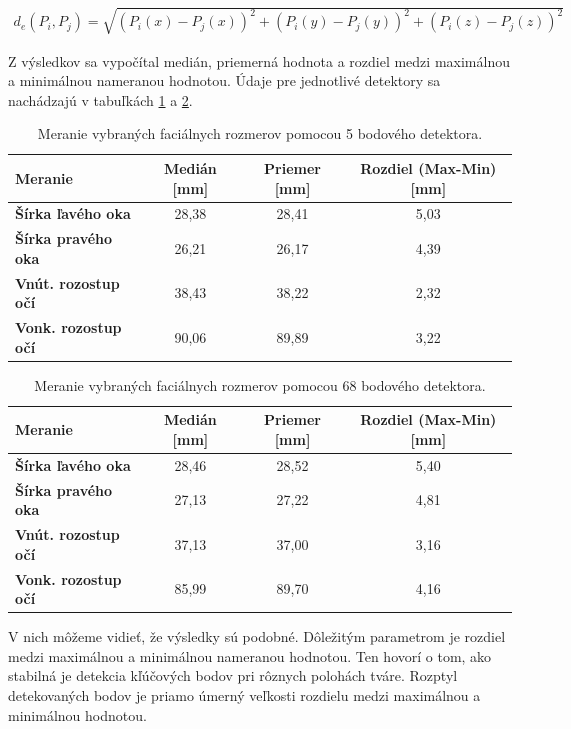 \begin{equation}
\label{eq:euclidean}
\begin{aligned}
d_{e}\left(P_i,P_j\right)= \sqrt{\left(P_i(x) - P_j(x)\right)^2 + \left(P_i(y) - P_j(y)\right)^2 + \left(P_i(z) - P_j(z)\right)^2} 
\end{aligned}
\end{equation}

Z výsledkov sa vypočítal medián, priemerná hodnota a rozdiel medzi maximálnou a minimálnou nameranou hodnotou. Údaje pre jednotlivé detektory sa nachádzajú v tabuľkách \ref{tab:dlib:5points} a \ref{tab:dlib:68points}.
 
\begin{table}[h]
	\caption{\label{tab:dlib:5points} Meranie vybraných faciálnych rozmerov pomocou 5 bodového detektora.}
	\centering
	\begin{tabular}{lccc}
		\toprule
		\textbf{Meranie} & \textbf{Medián [mm]} & \textbf{Priemer [mm]} & \textbf{Rozdiel (Max-Min) [mm]} \\ 
		\midrule
		\textbf{Šírka ľavého oka} 	& 28,38 & 28,41	& 5,03 \\
		\textbf{Šírka pravého oka} 	& 26,21	& 26,17 & 4,39 \\
		\textbf{Vnút. rozostup očí} 	& 38,43	& 38,22 & 2,32 \\
		\textbf{Vonk. rozostup očí} 	& 90,06	& 89,89 & 3,22 \\
		\bottomrule
	\end{tabular}
\end{table}

\begin{table}[h]
	\caption{\label{tab:dlib:68points} Meranie vybraných faciálnych rozmerov pomocou 68 bodového detektora.}
	\centering
	\begin{tabular}{lccc}
		\toprule
		\textbf{Meranie} & \textbf{Medián [mm]} & \textbf{Priemer [mm]} & \textbf{Rozdiel  (Max-Min) [mm]} \\ 
		\midrule
		\textbf{Šírka ľavého oka} 	& 28,46 & 28,52	& 5,40 \\
		\textbf{Šírka pravého oka} 	& 27,13	& 27,22 & 4,81 \\
		\textbf{Vnút. rozostup očí} 	& 37,13	& 37,00 & 3,16 \\
		\textbf{Vonk. rozostup očí} 	& 85,99	& 89,70 & 4,16 \\
		\bottomrule
	\end{tabular}
\end{table}

V nich môžeme vidieť, že výsledky sú podobné. Dôležitým parametrom je rozdiel medzi maximálnou a minimálnou nameranou hodnotou. Ten hovorí o tom, ako stabilná je detekcia kľúčových bodov pri rôznych polohách tváre. Rozptyl detekovaných bodov je priamo úmerný veľkosti rozdielu medzi maximálnou a minimálnou hodnotou.

